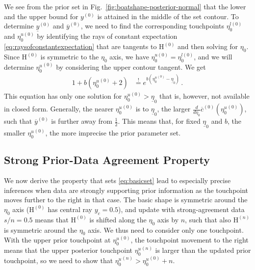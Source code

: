 \documentclass[runningheads,a4paper]{llncs}
\newcommand{\uz}{^{(0)}} %
\newcommand{\un}{^{(n)}} %
\newcommand{\ul}[1]{\underline{#1}}
\newcommand{\ol}[1]{\overline{#1}}
\def\yz{y\uz}
\def\yzl{\ul{y}\uz}
\def\yzu{\ol{y}\uz}
\def\EZ{\mathrm{H}\uz}
\def\EN{\mathrm{H}\un}
\newcommand{\ez}{\eta_0}
\def\ezl{\ul{\eta}_0}
\def\czu{\ol{c}\uz}
\begin{document}
We see from the prior set in Fig.~\ref{fig:boatshape-posterior-normal}
that the lower and the upper bound for $\yz$
is attained in the middle of the set contour.
To determine $\yzl$ and $\yzu$, we need to find the corresponding
touchpoints $\eta_0^{l(0)}$ and $\eta_0^{u(0)}$
by identifying the rays of constant expectation \eqref{eq:raysofconstantexpectation}
that are tangents to $\EZ$ and then solving for $\eta_0$.
Since $\EZ$ is symmetric to the $\eta_0$ axis, we have $\eta_0^{u(0)} = \eta_0^{l(0)}$,
and we will determine ${\eta_0^u}\uz$ by considering the upper contour tangent.
We get
\begin{align}
1 + b({\eta_0^u}\uz + 2) &\stackrel{!}{=} e^{b({\eta_0^u}\uz - \ezl)}\,.
\label{eq:eta0uprior}
\end{align}
This equation has only one solution for ${\eta_0^u}\uz > \ezl$
that is, however, not available in closed form.
Generally, the nearer ${\eta_0^u}\uz$ is to $\ezl$, the larger $\frac{d}{d\eta_0} \czu({\eta_0^u}\uz)$,
such that $\yzu$ %
is further away from $\frac{1}{2}$.
This means that, for fixed $\ezl$ and $b$, the smaller ${\eta_0^u}\uz$, the more imprecise the prior parameter set.


\subsection{Strong Prior-Data Agreement Property}
\label{sec:spda-property}

We now derive the property that sets \eqref{eq:basicset}
lead to especially precise inferences when data are strongly supporting prior information
as the touchpoint moves further to the right in that case. %
The basic shape is symmetric around the $\ez$ axis ($\EZ$ has central ray $y_c = 0.5$),
and update with strong-agreement data $s/n = 0.5$ means that $\EZ$ is shifted along the $\ez$ axis by $n$,
such that also $\EN$ is symmetric around the $\ez$ axis.
We thus need to consider only one touchpoint.
With the upper prior touchpoint at ${\eta_0^u}\uz$,
the touchpoint movement to the right means that the upper posterior touchpoint ${\eta_0^u}\un$
is larger than the updated prior touchpoint,
so we need to show that ${\eta_0^u}\un > {\eta_0^u}\uz + n$.
\end{document}
